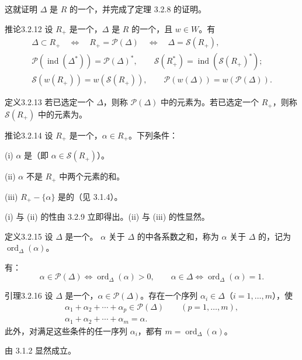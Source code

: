 这就证明 $\Delta$ 是 $R$ 的一个，并完成了定理 3.2.8 的证明。
\begin{SGAresult}{推论}{3.2.12}
设 $R_+$ 是一个，$\Delta$ 是 $R$ 的一个，且 $w\in W$。有
\begin{gather*}
\Delta\subset R_+\quad\Longleftrightarrow\quad R_+=\mathscr P(\Delta)\quad\Longleftrightarrow\quad\Delta=\mathscr S(R_+),\\
\mathscr P(\operatorname{ind}(\Delta^*))=\mathscr P(\Delta)^*,\qquad
\mathscr S(R_+^*)=\operatorname{ind}(\mathscr S(R_+)^*);\\
\mathscr S(w(R_+))=w(\mathscr S(R_+)),\qquad\mathscr P(w(\Delta))=w(\mathscr P(\Delta)).
\end{gather*}
\end{SGAresult}
\begin{SGAresult}{定义}{3.2.13}
若已选定一个 $\Delta$，则称 $\mathscr P(\Delta)$ 中的元素为。若已选定一个 $R_+$，则称 $\mathscr S(R_+)$ 中的元素为。
\end{SGAresult}
\begin{SGAresult}{推论}{3.2.14}
设 $R_+$ 是一个，$\alpha\in R_+$。下列条件：

(i) $\alpha$ 是（即 $\alpha\in\mathscr S(R_+)$）。

(ii) $\alpha$ 不是 $R_+$ 中两个元素的和。

(iii) $R_+-\{\alpha\}$ 是的（见 3.1.4）。
\end{SGAresult}
(i) 与 (ii) 的性由 3.2.9 立即得出。(ii) 与 (iii) 的性显然。

\begin{SGAresult}{定义}{3.2.15}
设 $\Delta$ 是一个。 $\alpha$ 关于 $\Delta$ 的中各系数之和，称为 $\alpha$ 关于 $\Delta$ 的，记为 $\operatorname{ord}_\Delta(\alpha)$。

有：
\[\alpha\in\mathscr P(\Delta)\Longleftrightarrow\operatorname{ord}_\Delta(\alpha)>0,\qquad
\alpha\in\Delta\Longleftrightarrow\operatorname{ord}_\Delta(\alpha)=1.\]
\end{SGAresult}
\begin{SGAresult}{引理}{3.2.16}
设 $\Delta$ 是一个，$\alpha\in\mathscr P(\Delta)$。存在一个序列 $\alpha_i\in\Delta$（$i=1,\ldots,m$），使
\begin{gather*}
\alpha_1+\alpha_2+\cdots+\alpha_p\in\mathscr P(\Delta)\qquad(p=1,\ldots,m),\\
\alpha_1+\alpha_2+\cdots+\alpha_m=\alpha.
\end{gather*}
此外，对满足这些条件的任一序列 $\alpha_i$，都有 $m=\operatorname{ord}_\Delta(\alpha)$。
\end{SGAresult}
由 3.1.2 显然成立。

